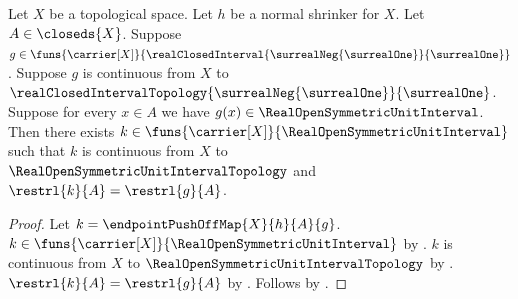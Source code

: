 \begin{theorem}\label{normal_shrinker_push_closed_unit_interval_into_open}
    Let $X$ be a topological space.
    Let $h$ be a normal shrinker for $X$.
    Let $A\in\closeds{X}$.
    Suppose
        $g\in\funs{\carrier[X]}
            {\realClosedInterval
                {\surrealNeg{\surrealOne}}{\surrealOne}}$.
    Suppose $g$ is continuous from $X$ to
        $\realClosedIntervalTopology
            {\surrealNeg{\surrealOne}}{\surrealOne}$.
    Suppose for every $x\in A$ we have
        $g(x)\in\RealOpenSymmetricUnitInterval$.
    Then there exists
        $k\in\funs{\carrier[X]}{\RealOpenSymmetricUnitInterval}$
        such that $k$ is continuous from $X$ to
            $\RealOpenSymmetricUnitIntervalTopology$ and
            $\restrl{k}{A}=\restrl{g}{A}$.
\end{theorem}
\begin{proof}
    Let $k=\endpointPushOffMap{X}{h}{A}{g}$.
    $k\in\funs{\carrier[X]}{\RealOpenSymmetricUnitInterval}$
        by .
    $k$ is continuous from $X$ to
        $\RealOpenSymmetricUnitIntervalTopology$
        by .
    $\restrl{k}{A}=\restrl{g}{A}$
        by .
    Follows by \auto.
\end{proof}
